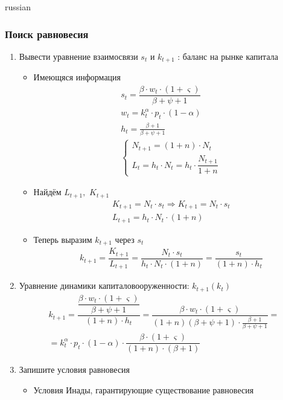 \documentclass[fleqn]{article}
\begin{document}
\begin{otherlanguage*}{russian}
\subsubsection*{Поиск равновесия}
\begin{enumerate}[label=\alph*), leftmargin=*]
\item Вывести уравнение взаимосвязи $ s_t $ и $ k_{t + 1} $ : баланс на рынке капитала
\begin{itemize}
\item Имеющяся информация 
\begin{align*}
s_t = \dfrac{\beta \cdot w_t \cdot (1 + \varsigma)}{\beta + \psi + 1} \\
w_t = k^{\alpha}_t \cdot p_t \cdot (1 - \alpha) \\
h_t = \frac{\beta + 1}{\beta + \psi + 1} \\
\begin{cases} 
N_{t+1} = (1 + n) \cdot N_t \\ 
L_t = h_t \cdot N_t = h_t \cdot \dfrac{N_{t+1}}{1 + n}
\end{cases} 
\end{align*}
\item Найдём $ L_{t+1}, \,\, K_{t+1} $ 
\begin{align*}
K_{t+1} = N_t \cdot s_t \Rightarrow K_{t+1} = N_t \cdot s_t \\
L_{t+1} = h_t \cdot N_t \cdot (1 + n) 
\end{align*}
\item Теперь выразим $ k_{t+1} $ через $ s_t $ 
\begin{align*}
k_{t+1} = \dfrac{K_{t+1}}{L_{t+1}} = \dfrac{N_t \cdot s_t}{h_t \cdot N_t \cdot (1 + n) }  = \dfrac{s_t}{(1 + n) \cdot h_t}
\end{align*}
\end{itemize}
\item Уравнение динамики капиталовооруженности: $ k_{t+1} (k_t) $ 
\begin{align*}
k_{t+1} = \dfrac{\dfrac{\beta \cdot w_t \cdot (1 + \varsigma)}{\beta + \psi + 1 }}{(1 + n) \cdot h_t } = \dfrac{\beta \cdot w_t \cdot (1 + \varsigma )}{(1 + n) (\beta + \psi + 1) \cdot \frac{\beta + 1}{\beta + \psi + 1} } = \\
= k^{\alpha}_t \cdot p_t \cdot (1 - \alpha) \cdot \dfrac{\beta \cdot (1 + \varsigma)}{(1 + n) \cdot (\beta + 1) } 
\end{align*}
\item Запишите условия равновесия 
\begin{itemize}
\item Условия Инады, гарантирующие существование равновесия 

\end{itemize}
\end{enumerate}
\end{otherlanguage*}
\end{document}
